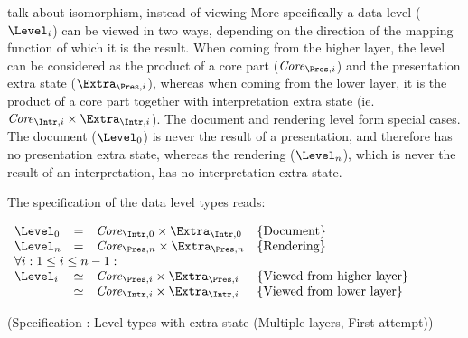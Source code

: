 


\bc
\toHere
talk about isomorphism, instead of viewing
\fromHere
More specifically a data level ($\Level_{i}$) can be viewed in two ways, depending on the direction of the mapping function of which it is the result. When coming from the higher layer, the level can be considered as the product of a core part ($\Core_{\Pres,i}$) and the presentation extra state ($\Extra_{\Pres,i}$), whereas when coming from the lower layer, it is the product of a core part together with interpretation extra state (ie. $\Core_{\Intr,i} \times \Extra_{\Intr,i}$). The document and rendering level form special cases. The document ($\Level_0$) is never the result of a presentation, and therefore has no presentation extra state, whereas the rendering ($\Level_n$), which is never the result of an interpretation, has no interpretation extra state.

The specification of the data level types reads:

\begin{small}
 \label{spec:levelMultiFirst}
\(\begin{array}{lcll}
\Level_{0} & = & \Core_{\Intr,0} \times \Extra_{\Intr,0}      & \text{\{Document\}}\\
\Level_{n} & = & \Core_{\Pres,n} \times \Extra_{\Pres,n}      & \text{\{Rendering\}}\\
\lefteqn{\forall i:1 \le i \le n-1:}  \\
\Level_{i}  & \simeq & \Core_{\Pres,i} \times \Extra_{\Pres,i}     & \text{\{Viewed from higher layer\}}\\
                & \simeq & \Core_{\Intr,i} \times \Extra_{\Intr,i} &  \text{\{Viewed from lower layer\}}\\
\end{array}\)\end{small}
\begin{center}(Specification \thespecification: Level types with extra state (Multiple layers, First attempt))\end{center}\vspace{1em}



